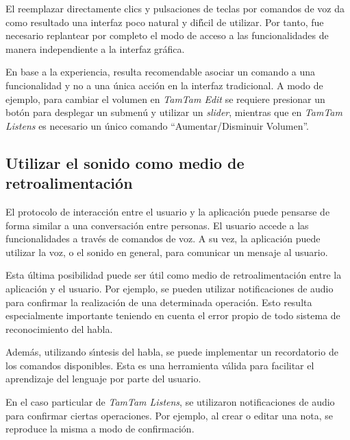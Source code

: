 El reemplazar directamente clics y pulsaciones de teclas por comandos de voz da
como resultado una interfaz poco natural y dif{\'\i}cil de utilizar. Por tanto, fue
necesario replantear por completo el modo de acceso a las funcionalidades de manera
independiente a la interfaz gr\'afica.

En base a la experiencia, resulta recomendable asociar un comando a una funcionalidad
y no a una \'unica acci\'on en la interfaz tradicional. A modo de ejemplo, para cambiar el
volumen en \emph{TamTam Edit} se requiere presionar un bot\'on para desplegar un submen\'u 
y utilizar un \emph{slider}, mientras que en \emph{TamTam Listens} es necesario un
\'unico comando ``Aumentar/Disminuir Volumen''.

\subsection{Utilizar el sonido como medio de retroalimentaci\'on}
El protocolo de interacci\'on entre el usuario y la aplicaci\'on puede pensarse de forma similar a una 
conversaci\'on entre personas. El usuario accede a las funcionalidades a trav\'es de comandos de voz.
A su vez, la aplicaci\'on puede utilizar la voz, o el sonido en general, para comunicar un mensaje al usuario.

Esta \'ultima posibilidad puede ser \'util como medio de retroalimentaci\'on entre la aplicaci\'on y el usuario.
Por ejemplo, se pueden utilizar notificaciones de audio para confirmar la realizaci\'on de una determinada
operaci\'on. Esto resulta especialmente importante teniendo en cuenta el error propio de todo sistema
de reconocimiento del habla.

Adem\'as, utilizando s{\'\i}ntesis del habla, se puede implementar un recordatorio de los comandos
disponibles. Esta es una herramienta v\'alida para facilitar el aprendizaje del lenguaje por parte del
usuario.

En el caso particular de \emph{TamTam Listens}, se utilizaron notificaciones de audio para confirmar
ciertas operaciones. Por ejemplo, al crear o editar una nota, se reproduce la misma a modo de
confirmaci\'on.

